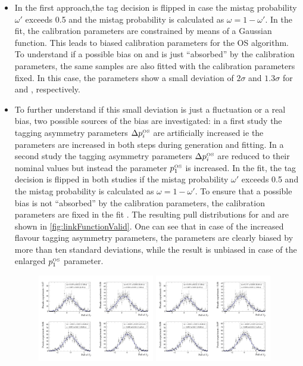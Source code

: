 \begin{itemize}
	\item In the first approach,the tag decision is flipped in case the mistag probability $\omega'$ exceeds \num{0.5} and the mistag probability is calculated as $\omega=1-\omega'$.
	In the fit, the calibration parameters are constrained by means of a Gaussian function. This leads to biased calibration parameters for the OS algorithm.
	To understand if a possible bias on \Sf and \Sfbar is just \enquote{absorbed} by the calibration parameters, the same samples are also fitted with the calibration parameters fixed.
	In this case, the \CP parameters show a small deviation of $2\sigma$ and $1.3\sigma$ for \Sf and \Sfbar, respectively.
	\item To further understand if this small deviation is just a fluctuation or a real bias, two possible sources of the bias are investigated:
	in a first study the tagging asymmetry parameters $\Delta p_i^{\text{\tiny OS}}$ are artificially increased ie the parameters are increased in both steps during generation and fitting.
    In a second study the tagging asymmetry parameters $\Delta p_i^{\text{\tiny OS}}$ are reduced to their nominal values but instead the parameter $p_1^{\text{\tiny OS}}$ is increased.
	In the fit, the tag decision is flipped in both studies if the mistag probability $\omega'$ exceeds \num{0.5} and the mistag probability is calculated as $\omega=1-\omega'$.
	To ensure that a possible bias is not \enquote{absorbed} by the calibration parameters, the calibration parameters are fixed in the fit .
	The resulting pull distributions for \Sf and \Sfbar are shown in \cref{fig:linkFunctionValid}.
	One can see that in case of the increased flavour tagging asymmetry parameters, the \CP parameters are clearly biased by more than ten standard deviations, while the result is unbiased in case of the enlarged $p_1^{\text{\tiny OS}}$ parameter.
	\begin{figure}[tbp]
    \centering
    	\includegraphics[width=0.48\textwidth]{10TimeFit/figs/Sf_pull_LinkValid_asym.pdf}
    	\includegraphics[width=0.48\textwidth]{10TimeFit/figs/Sfbar_pull_LinkValid_asym.pdf}\\

\end{figure}
\end{itemize}

